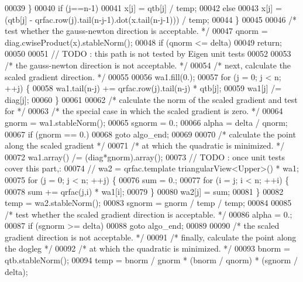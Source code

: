 \begin{DoxyCode}
00039         \}
00040         \textcolor{keywordflow}{if} (j==n-1)
00041             x[j] = qtb[j] / temp;
00042         \textcolor{keywordflow}{else}
00043             x[j] = (qtb[j] - qrfac.row(j).tail(n-j-1).dot(x.tail(n-j-1))) / temp;
00044     \}
00045 
00046     \textcolor{comment}{/* test whether the gauss-newton direction is acceptable. */}
00047     qnorm = diag.cwiseProduct(x).stableNorm();
00048     \textcolor{keywordflow}{if} (qnorm <= delta)
00049         \textcolor{keywordflow}{return};
00050 
00051     \textcolor{comment}{// TODO : this path is not tested by Eigen unit tests}
00052 
00053     \textcolor{comment}{/* the gauss-newton direction is not acceptable. */}
00054     \textcolor{comment}{/* next, calculate the scaled gradient direction. */}
00055 
00056     wa1.fill(0.);
00057     \textcolor{keywordflow}{for} (j = 0; j < n; ++j) \{
00058         wa1.tail(n-j) += qrfac.row(j).tail(n-j) * qtb[j];
00059         wa1[j] /= diag[j];
00060     \}
00061 
00062     \textcolor{comment}{/* calculate the norm of the scaled gradient and test for */}
00063     \textcolor{comment}{/* the special case in which the scaled gradient is zero. */}
00064     gnorm = wa1.stableNorm();
00065     sgnorm = 0.;
00066     alpha = delta / qnorm;
00067     \textcolor{keywordflow}{if} (gnorm == 0.)
00068         \textcolor{keywordflow}{goto} algo\_end;
00069 
00070     \textcolor{comment}{/* calculate the point along the scaled gradient */}
00071     \textcolor{comment}{/* at which the quadratic is minimized. */}
00072     wa1.array() /= (diag*gnorm).array();
00073     \textcolor{comment}{// TODO : once unit tests cover this part,:}
00074     \textcolor{comment}{// wa2 = qrfac.template triangularView<Upper>() * wa1;}
00075     \textcolor{keywordflow}{for} (j = 0; j < n; ++j) \{
00076         sum = 0.;
00077         \textcolor{keywordflow}{for} (i = j; i < n; ++i) \{
00078             sum += qrfac(j,i) * wa1[i];
00079         \}
00080         wa2[j] = sum;
00081     \}
00082     temp = wa2.stableNorm();
00083     sgnorm = gnorm / temp / temp;
00084 
00085     \textcolor{comment}{/* test whether the scaled gradient direction is acceptable. */}
00086     alpha = 0.;
00087     \textcolor{keywordflow}{if} (sgnorm >= delta)
00088         \textcolor{keywordflow}{goto} algo\_end;
00089 
00090     \textcolor{comment}{/* the scaled gradient direction is not acceptable. */}
00091     \textcolor{comment}{/* finally, calculate the point along the dogleg */}
00092     \textcolor{comment}{/* at which the quadratic is minimized. */}
00093     bnorm = qtb.stableNorm();
00094     temp = bnorm / gnorm * (bnorm / qnorm) * (sgnorm / delta);

\end{DoxyCode}
